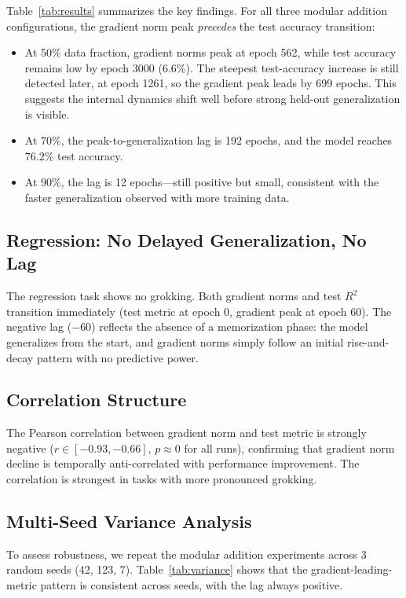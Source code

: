 \documentclass[11pt,a4paper]{article}
\begin{document}
Table~\ref{tab:results} summarizes the key findings. For all three modular addition configurations, the gradient norm peak \emph{precedes} the test accuracy transition:

\begin{itemize}
    \item At 50\% data fraction, gradient norms peak at epoch 562, while test accuracy remains low by epoch 3000 (6.6\%). The steepest test-accuracy increase is still detected later, at epoch 1261, so the gradient peak leads by 699 epochs. This suggests the internal dynamics shift well before strong held-out generalization is visible.
    \item At 70\%, the peak-to-generalization lag is 192 epochs, and the model reaches 76.2\% test accuracy.
    \item At 90\%, the lag is 12 epochs---still positive but small, consistent with the faster generalization observed with more training data.
\end{itemize}

\subsection{Regression: No Delayed Generalization, No Lag}

The regression task shows no grokking. Both gradient norms and test $R^2$ transition immediately (test metric at epoch 0, gradient peak at epoch 60). The negative lag ($-60$) reflects the absence of a memorization phase: the model generalizes from the start, and gradient norms simply follow an initial rise-and-decay pattern with no predictive power.

\subsection{Correlation Structure}

The Pearson correlation between gradient norm and test metric is strongly negative ($r \in [-0.93, -0.66]$, $p \approx 0$ for all runs), confirming that gradient norm decline is temporally anti-correlated with performance improvement. The correlation is strongest in tasks with more pronounced grokking.

\subsection{Multi-Seed Variance Analysis}

To assess robustness, we repeat the modular addition experiments across 3 random seeds (42, 123, 7). Table~\ref{tab:variance} shows that the gradient-leading-metric pattern is consistent across seeds, with the lag always positive.
\end{document}
